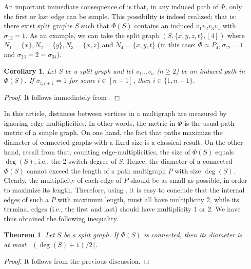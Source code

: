 \documentclass[11pt]{elsarticle}
\newtheorem{theorem}{Theorem}[section]
\newtheorem{corollary}[corollary]{Corollary}
\begin{document}
An important immediate consequence of  is that, in any induced path of $\Phi$, only the first or last edge can be simple. This possibility is indeed realized; that is: there exist split graphs $S$ such that $\Phi(S)$ contains an induced $v_1v_2v_3v_4$ with $\sigma_{12}=1$. As an example, we can take the split graph $(S,\{x,y,z,t\},[4])$ where $N_1=\{x\}, N_2=\{y\}, N_3=\{x,z\}$ and $N_4=\{x,y,t\}$ (in this case: $\Phi\approx P_4, \sigma_{12}=1$ and $\sigma_{23}=2=\sigma_{34}$).

\begin{corollary}
	\label{no.aristas.simples.internas.en.P_n}
	Let $S$ be a split graph and let $v_1\ldots v_n$ ($n\geq 2$) be an induced path in $\Phi(S)$. If $\sigma_{i,i+1}=1$ for some $i\in[n-1]$, then $i\in\{1,n-1\}$. 
\end{corollary}

\begin{proof}
	It follows immediately from .
\end{proof}

In this article, distances between vertices in a multigraph are measured by ignoring edge multiplicities. In other words, the metric in $\Phi$ is the usual path-metric of a simple graph. On one hand, the fact that paths maximize the diameter of connected graphs with a fixed size is a classical result. On the other hand, recall from  that, counting edge-multiplicities, the size of $\Phi(S)$ equals $\deg(S)$, i.e., the 2-switch-degree of $S$. Hence, the diameter of a connected $\Phi(S)$ cannot exceed the length of a path multigraph $P$ with size $\deg(S)$. Clearly, the multiplicity of each edge of $P$ should be as small as possible, in order to maximize its length. Therefore, using , it is easy to conclude that the internal edges of such a $P$ with maximum length, must all have multiplicity 2, while its terminal edges (i.e., the first and last) should have multiplicity 1 or 2. We have thus obtained the following inequality.

\begin{theorem}
	\label{diam_deg_bound}
	Let $S$ be a split graph. If $\Phi(S)$ is connected, then its diameter is at most $\lceil (\deg(S)+1)/2 \rceil$.
\end{theorem}

\begin{proof}
	It follows from the previous discussion.
\end{proof}		
\end{document}
